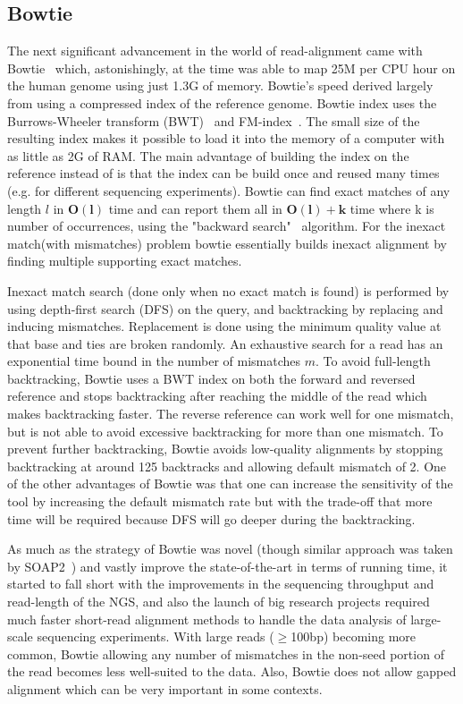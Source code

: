 \subsection{Bowtie~\citep{bowtie}} \label{bowtie}
The next significant advancement in the world of read-alignment came with Bowtie~\citep{bowtie} which, astonishingly, at the time was able to map 25M \reads per CPU hour on the human genome using just 1.3G of memory. Bowtie's speed derived largely from using a compressed index of the reference genome. Bowtie index uses the Burrows-Wheeler transform (BWT)~\citep{burrows1994block} and FM-index~\citep{ferragina2000opportunistic, ferragina2001experimental}. The small size of the resulting index makes it possible to load it into the memory of a computer with as little as 2G of RAM. The main advantage of building the index on the reference instead of \reads is that the index can be build once and reused many times (e.g. for different sequencing experiments). Bowtie can find exact matches of any length $l$ in $\bm{O(l)}$ time and can report them all in $\bm{O(l) + k}$ time where k is number of occurrences, using the "backward search"~\citep{ferragina2000opportunistic} algorithm. For the inexact match(with mismatches) problem bowtie essentially builds inexact alignment by finding multiple supporting exact matches.

Inexact match search (done only when no exact match is found) is performed by using depth-first search (DFS) on the query, and backtracking by replacing and inducing mismatches. Replacement is done using the minimum quality value at that base and ties are broken randomly. An exhaustive search for a read has an exponential time bound in the number of mismatches $m$. To avoid full-length backtracking, Bowtie uses a BWT index on both the forward and reversed reference and stops backtracking after reaching the middle of the read which makes backtracking faster. The reverse reference can work well for one mismatch, but is not able to avoid excessive backtracking for more than one mismatch. To prevent further backtracking, Bowtie avoids low-quality alignments by stopping backtracking at around 125 backtracks and allowing default mismatch of 2. One of the other advantages of Bowtie was that one can increase the sensitivity of the tool by increasing the default mismatch rate but with the trade-off that more time will be required because DFS will go deeper during the backtracking. 

As much as the strategy of Bowtie was novel (though similar approach was taken by SOAP2~\citep{li2009soap2}) and vastly improve the state-of-the-art in terms of running time, it started to fall short with the improvements in the sequencing throughput and read-length of the NGS, and also the launch of big research projects required much faster short-read alignment methods to handle the data analysis of large-scale sequencing experiments. With large reads ($\geq$100bp) becoming more common, Bowtie allowing any number of mismatches in the non-seed portion of the read becomes less well-suited to the data. Also, Bowtie does not allow gapped alignment which can be very important in some contexts.


